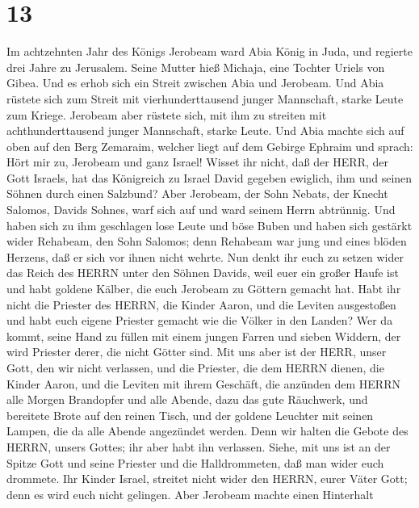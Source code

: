 \hypertarget{section-12}{%
\section{13}\label{section-12}}

 Im achtzehnten Jahr des Königs Jerobeam ward Abia König in
Juda,  und regierte drei Jahre zu Jerusalem. Seine Mutter
hieß Michaja, eine Tochter Uriels von Gibea. Und es erhob sich ein
Streit zwischen Abia und Jerobeam.  Und Abia rüstete sich
zum Streit mit vierhunderttausend junger Mannschaft, starke Leute zum
Kriege. Jerobeam aber rüstete sich, mit ihm zu streiten mit
achthunderttausend junger Mannschaft, starke Leute.  Und
Abia machte sich auf oben auf den Berg Zemaraim, welcher liegt auf dem
Gebirge Ephraim und sprach: Hört mir zu, Jerobeam und ganz Israel!
 Wisset ihr nicht, daß der HERR, der Gott Israels, hat das
Königreich zu Israel David gegeben ewiglich, ihm und seinen Söhnen durch
einen Salzbund?  Aber Jerobeam, der Sohn Nebats, der Knecht
Salomos, Davids Sohnes, warf sich auf und ward seinem Herrn abtrünnig.
 Und haben sich zu ihm geschlagen lose Leute und böse Buben
und haben sich gestärkt wider Rehabeam, den Sohn Salomos; denn Rehabeam
war jung und eines blöden Herzens, daß er sich vor ihnen nicht wehrte.
 Nun denkt ihr euch zu setzen wider das Reich des HERRN
unter den Söhnen Davids, weil euer ein großer Haufe ist und habt goldene
Kälber, die euch Jerobeam zu Göttern gemacht hat.  Habt ihr
nicht die Priester des HERRN, die Kinder Aaron, und die Leviten
ausgestoßen und habt euch eigene Priester gemacht wie die Völker in den
Landen? Wer da kommt, seine Hand zu füllen mit einem jungen Farren und
sieben Widdern, der wird Priester derer, die nicht Götter sind.
 Mit uns aber ist der HERR, unser Gott, den wir nicht
verlassen, und die Priester, die dem HERRN dienen, die Kinder Aaron, und
die Leviten mit ihrem Geschäft,  die anzünden dem HERRN
alle Morgen Brandopfer und alle Abende, dazu das gute Räuchwerk, und
bereitete Brote auf den reinen Tisch, und der goldene Leuchter mit
seinen Lampen, die da alle Abende angezündet werden. Denn wir halten die
Gebote des HERRN, unsers Gottes; ihr aber habt ihn verlassen.
 Siehe, mit uns ist an der Spitze Gott und seine Priester
und die Halldrommeten, daß man wider euch drommete. Ihr Kinder Israel,
streitet nicht wider den HERRN, eurer Väter Gott; denn es wird euch
nicht gelingen.  Aber Jerobeam machte einen Hinterhalt
